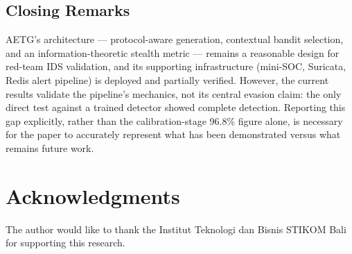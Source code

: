 \documentclass[review]{elsarticle}
\begin{document}
\subsection{Closing Remarks}
AETG's architecture --- protocol-aware generation, contextual bandit selection, and an information-theoretic stealth metric --- remains a reasonable design for red-team IDS validation, and its supporting infrastructure (mini-SOC, Suricata, Redis alert pipeline) is deployed and partially verified. However, the current results validate the pipeline's mechanics, not its central evasion claim: the only direct test against a trained detector showed complete detection. Reporting this gap explicitly, rather than the calibration-stage 96.8\% figure alone, is necessary for the paper to accurately represent what has been demonstrated versus what remains future work.

\section*{Acknowledgments}
The author would like to thank the Institut Teknologi dan Bisnis STIKOM Bali for supporting this research.



\end{document}
